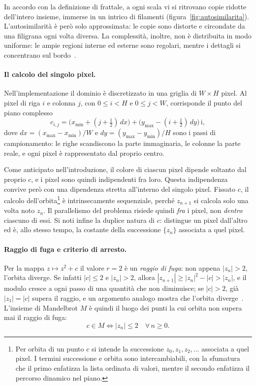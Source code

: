 In accordo con la definizione di frattale, a ogni scala vi si ritrovano copie
ridotte dell'intero insieme, immerse in un intrico di filamenti
(figura~\ref{fig:autosimilarita}). L'autosimilarità è però solo approssimata: le
copie sono distorte e circondate da una filigrana ogni volta diversa. La
complessità, inoltre, non è distribuita in modo uniforme: le ampie regioni
interne ed esterne sono regolari, mentre i dettagli si concentrano sul
bordo~\cite{intro_fractals}.

\paragraph{Il calcolo del singolo pixel.}
Nell'implementazione il dominio è discretizzato in una griglia di $W \times H$
pixel. Al pixel di riga $i$ e colonna $j$, con $0 \leq i < H$ e $0 \leq j < W$,
corrisponde il punto del piano complesso
\[
c_{i,j} = \bigl(x_{\min} + (j + \tfrac{1}{2})\,dx\bigr) + \bigl(y_{\max} - (i + \tfrac{1}{2})\,dy\bigr)\,\mathrm{i},
\]
dove $dx = (x_{\max}-x_{\min})/W$ e $dy = (y_{\max}-y_{\min})/H$ sono i passi di
campionamento: le righe scandiscono la parte immaginaria, le colonne la parte
reale, e ogni pixel è rappresentato dal proprio centro.

Come anticipato nell'introduzione, il colore di ciascun pixel dipende soltanto
dal proprio $c$, e i pixel sono quindi indipendenti fra loro. Questa
indipendenza convive però con una dipendenza stretta all'interno del singolo
pixel. Fissato $c$, il calcolo dell'orbita\footnote{Per orbita di un punto $c$
si intende la successione $z_0, z_1, z_2, \dots$ associata a quel pixel. I
termini successione e orbita sono intercambiabili, con la sfumatura che il primo
enfatizza la lista ordinata di valori, mentre il secondo enfatizza il percorso
dinamico nel piano.} è intrinsecamente sequenziale, perché $z_{n+1}$ si calcola
solo una volta noto $z_n$. Il parallelismo del problema risiede quindi
\emph{fra} i pixel, non \emph{dentro} ciascuno di essi. Si noti infine la
duplice natura di $c$: distingue un pixel dall'altro ed è, allo stesso tempo, la
costante della successione $\{z_n\}$ associata a quel pixel.

\paragraph{Raggio di fuga e criterio di arresto.} \label{convergence}
Per la mappa $z \mapsto z^2 + c$ il valore $r = 2$ è un \emph{raggio di fuga}:
non appena $|z_n| > 2$, l'orbita diverge. Se infatti $|c| \leq 2$ e
$|z_n| > 2$, allora $|z_{n+1}| \geq |z_n|^2 - |c| > |z_n|$, e il modulo cresce a
ogni passo di una quantità che non diminuisce; se $|c| > 2$, già $|z_1| = |c|$
supera il raggio, e un argomento analogo mostra che l'orbita
diverge~\cite{fractals_def}. L'insieme di Mandelbrot $M$ è quindi il luogo dei
punti la cui orbita non supera mai il raggio di fuga:
\begin{equation}\label{equ:convergence}
    c \in M \iff |z_n| \leq 2 \quad \forall\, n \geq 0.
\end{equation}

